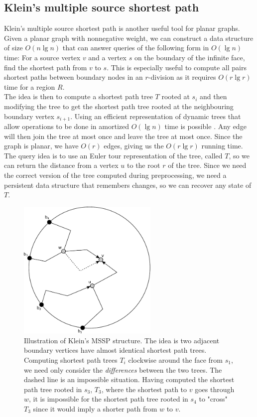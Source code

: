 \subsection{Klein's multiple source shortest path}
Klein's multiple source shortest path \cite{klein2005multiple} is another useful tool for planar
graphs. Given a planar graph with nonnegative weight, we can construct a data structure
of size $O(n \lg n)$ that can answer queries of the following form in $O(\lg n)$ time:
For a source vertex $v$ and a vertex $s$ on the boundary of the infinite face, find the
shortest path from $v$ to $s$. This is especially useful to compute all pairs shortest paths between boundary
nodes in an $r$-division as it requires $O(r\lg r)$ time for a region $R$. \\
The idea is then to compute a shortest path tree $T$ rooted at
$s_i$ and then modifying the tree to get the shortest path tree rooted at the
neighbouring boundary vertex $s_{i+1}$. Using an efficient representation of dynamic
trees that allow operations to be done in amortized $O(\lg n)$ time is possible
\cite{tarjan2005self}\cite{henzinger1999randomized}. Any edge will then join the tree at
most once and leave the tree at most once. Since the graph is planar, we have $O(r)$ edges,
giving us the $O(r\lg r)$ running time. \\
The query idea is to use an Euler tour representation of the tree, called $T$, so we can
return the distance from a vertex $u$ to the root $r$ of the tree. Since we need the
correct version of the tree computed during preprocessing, we need a persistent data
structure that remembers changes, so we can recover any state of $T$.

\begin{figure}[h!]
  \centering
  \includegraphics[width=0.6\textwidth]{figs/klein.pdf}
  \caption{Illustration of Klein's MSSP structure. The idea is two adjacent boundary
    vertices have almost identical shortest path trees. Computing shortest path trees
    $T_i$ clockwise
    around the face from $s_1$, we need only consider the \textit{differences} between
  the two trees. The dashed line is an impossible situation. Having computed the shortest
path tree rooted in $s_3$, $T_3$, where the shortest path to $v$ goes through $w$, it is
impossible for the shortest path tree rooted in $s_4$ to "cross" $T_3$ since it would
imply a shorter path from $w$ to $v$.}
    \label{klein}
\end{figure}

